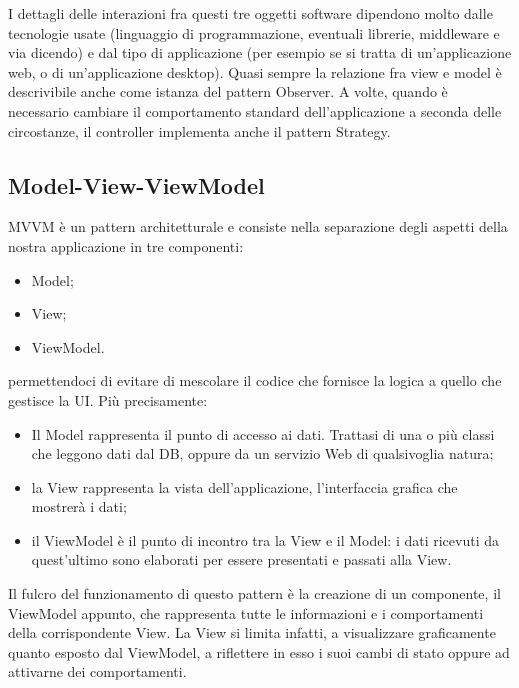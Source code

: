 I dettagli delle interazioni fra questi tre oggetti software dipendono molto dalle tecnologie usate (linguaggio di programmazione, eventuali librerie, middleware e via dicendo) e dal tipo di applicazione (per esempio se si tratta di un'applicazione web, o di un'applicazione desktop). 
Quasi sempre la relazione fra view e model è descrivibile anche come istanza del pattern Observer. A volte, quando è necessario cambiare il comportamento standard dell'applicazione a seconda delle circostanze, il controller implementa anche il pattern Strategy.


\subsection{Model-View-ViewModel}
MVVM è un pattern architetturale e consiste nella separazione degli aspetti della nostra applicazione in tre componenti:
\begin{itemize}
\item Model;
\item View;
\item ViewModel.
\end{itemize}
permettendoci di evitare di mescolare il codice che fornisce la logica a quello che gestisce la UI.
Più precisamente:
\begin{itemize}
	\item Il Model rappresenta il punto di accesso ai dati. Trattasi di una o più classi che leggono dati dal DB, oppure da un servizio Web di qualsivoglia natura;
	\item la View rappresenta la vista dell'applicazione, l'interfaccia grafica che mostrerà i dati;
	\item il ViewModel è il punto di incontro tra la View e il Model: i dati ricevuti da quest'ultimo sono elaborati per essere presentati e passati alla View.
\end{itemize}

Il fulcro del funzionamento di questo pattern è la creazione di un componente, il ViewModel appunto, che rappresenta tutte le informazioni e i comportamenti della corrispondente View. La View si limita infatti, a visualizzare graficamente quanto esposto dal ViewModel, a riflettere in esso i suoi cambi di stato oppure ad attivarne dei comportamenti.

